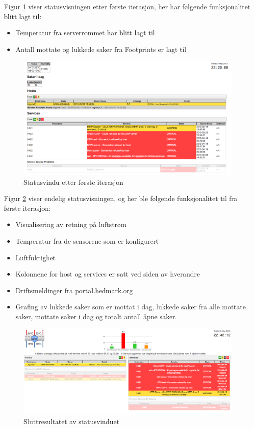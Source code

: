 Figur \ref{statusvindu_first} viser statusvisningen etter første iterasjon, her har følgende funksjonalitet blitt lagt til:
\begin{itemize}
	\item Temperatur fra serverrommet har blitt lagt til
	\item Antall mottate og lukkede saker fra Footprints er lagt til
\end{itemize}

\begin{figure}[H]
    \centering
    \includegraphics[scale=0.3]{img/statusvindu_first}
    \caption{Statusvindu etter første iterasjon}
    \label{statusvindu_first}
\end{figure}

Figur \ref{statusvindu_final} viser endelig statusvisningen, og her ble følgende funksjonalitet til fra første iterasjon:

\begin{itemize}
	\item Visualisering av retning på luftstrøm
	\item Temperatur fra de sensorene som er konfigurert
	\item Luftfuktighet
	\item Kolonnene for host og services er satt ved siden av hverandre
	\item Driftsmeldinger fra portal.hedmark.org
	\item Grafing av lukkede saker som er mottat i dag, lukkede saker fra alle mottate saker,
	mottate saker i dag og totalt antall åpne saker.
\end{itemize}

\begin{figure}[H]
    \centering
    \includegraphics[scale=0.3]{img/statusvindu_final}
    \caption{Sluttresultatet av statusvinduet}
    \label{statusvindu_final}
\end{figure}


